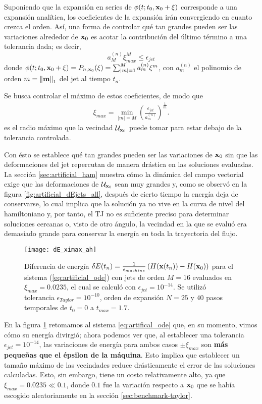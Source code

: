 Suponiendo que la expansión en series de $\phi(t;t_0,\mathbf{x}_0 + \xi)$ corresponde a una expansión analítica, los coeficientes de la expansión irán convergiendo en cuanto crezca el orden. Así, una forma de controlar qué tan grandes pueden ser las variaciones alrededor de $\mathbf{x}_0$ es acotar la contribución del último término a una tolerancia dada; es decir,
\begin{equation*}
 a_{M}^{(n)}\xi_{max}^M \leq \epsilon_{jet}
\end{equation*}
donde $\phi(t;t_0,\mathbf{x}_0 + \xi) = P_{n,\mathbf{x}_0}(\xi) = \sum_{|m|=1}^M  a_{m}^{(n)} \xi^m$, con $a_{m}^{(n)}$ el polinomio de orden $m = \left\lVert\mathbf{m}\right\rVert_1$ del jet al tiempo $t_n$.

Se busca controlar el máximo de estos coeficientes, de modo que 
\begin{align}
 \xi_{max} = \min_{|m|=M} \left( \frac{\epsilon_{jet}}{a_{m}^{(n)}} \right)^{\frac{1}{m}}.
\end{align}
es el radio máximo que la vecindad $\mathcal{U}_{\mathbf{x}_0}$ puede tomar para estar debajo de la tolerancia controlada. 

Con ésto se establece qué tan grandes pueden ser las variaciones de $\mathbf{x}_0$ sin que las deformaciones del jet repercutan de manera drástica en las soluciones evaluadas. La sección \ref{sec:artificial_ham} muestra cómo la dinámica del campo vectorial exige que las deformaciones de $\mathcal{U}_{\mathbf{x}_0}$ sean muy grandes y, como se observó en la figura \ref{fig:artificial_dEjets_all}, después de cierto tiempo la energía deja de conservarse, lo cual implica que la solución ya no vive en la curva de nivel del hamiltoniano y, por tanto, el TJ no es suficiente preciso para determinar soluciones cercanas o, visto de otro ángulo, la vecindad en la que se evaluó era demasiado grande para conservar la energía en toda la trayectoria del flujo.

\begin{figure}[h!]
	\centering
	\texttt{[image: dE\_ximax\_ah]}
	\caption{Diferencia de energía $\delta E(t_n) = \frac{1}{\epsilon_{machine}} \left( H(\mathbf{x}(t_n)) - H(\mathbf{x}_0) \right)$ para el sistema (\ref{eq:artificial_ode}) con jets de orden $M=16$ evaluados en $\xi_{max} = 0.0235$, el cual se calculó con $\epsilon_{jet} = 10^{-14}$. Se utilizó tolerancia $\epsilon_{Taylor} = 10^{-10}$, orden de expansión $N = 25$ y $40$ pasos temporales de $t_0 = 0$ a $t_{max} = 1.7$.}
	\label{fig:dE_ximax_ah}
\end{figure}

En la figura \ref{fig:dE_ximax_ah} retomamos al sistema \ref{eq:artifical_ode} que, en su momento, vimos cómo su energía divirgió; ahora podemos ver que, al establecer una tolerancia $\epsilon_{jet} = 10^{-14}$, las variaciones de energía para ambos casos $\pm \xi_{max}$ son \textbf{más pequeñas que el épsilon de la máquina}. Esto implica que establecer un tamaño máximo de las vecindades reduce drásticamente el error de las soluciones calculadas. Esto, sin embargo, tiene un costo relativamente alto, ya que $\xi_{max} = 0.0235 \ll 0.1$, donde $0.1$ fue la variación respecto a $\mathbf{x}_0$ que se había escogido aleatoriamente en la sección \ref{sec:benchmark-taylor}. 

